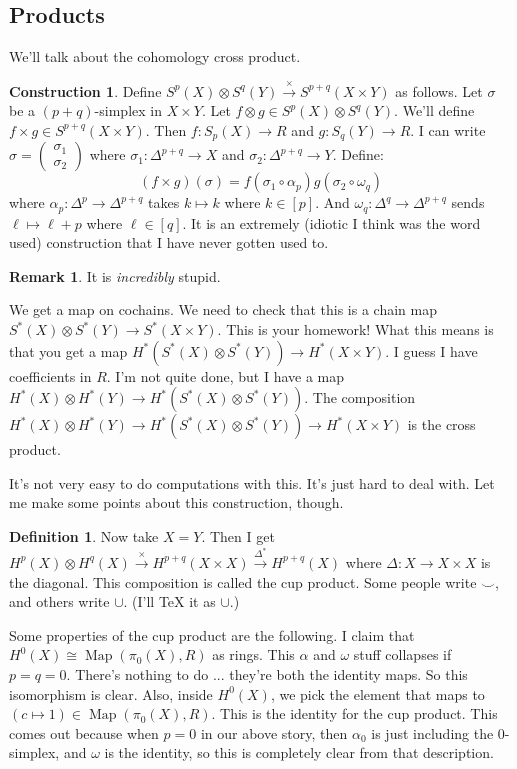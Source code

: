 \documentclass{amsart}
\theoremstyle{theorem}
\theoremstyle{definition}
\newtheorem{definition}[theorem]{Definition}
\newtheorem{construction}[theorem]{Construction}
\newtheorem{remark}[theorem]{Remark}
\DeclareMathOperator{\Map}{Map}
\begin{document}
\subsection{Products}
We'll talk about the cohomology cross product.
\begin{construction}
Define $S^p(X)\otimes S^q(Y)\xrightarrow{\times}S^{p+q}(X\times Y)$ as follows. Let $\sigma$ be a $(p+q)$-simplex in $X\times Y$. Let $f\otimes g\in S^p(X)\otimes S^q(Y)$. We'll define $f\times g\in S^{p+q}(X\times Y)$. Then $f:S_p(X)\to R$ and $g:S_q(Y)\to R$. I can write $\sigma=\begin{pmatrix}\sigma_1 \\ \sigma_2\end{pmatrix}$ where $\sigma_1:\Delta^{p+q}\to X$ and $\sigma_2:\Delta^{p+q}\to Y$. Define:
\begin{equation*}
(f\times g)(\sigma)=f(\sigma_1\circ\alpha_p)g(\sigma_2\circ\omega_q)
\end{equation*}
where $\alpha_p:\Delta^p\to\Delta^{p+q}$ takes $k\mapsto k$ where $k\in[p]$. And $\omega_q:\Delta^q\to\Delta^{p+q}$ sends $\ell\mapsto \ell+p$ where $\ell\in[q]$. It is an extremely (idiotic I think was the word used) construction that I have never gotten used to.
\begin{remark}
It is \emph{incredibly} stupid.
\end{remark}
We get a map on cochains. We need to check that this is a chain map $S^\ast(X)\otimes S^\ast(Y)\to S^\ast(X\times Y)$. This is your homework! What this means is that you get a map $ H^\ast(S^\ast(X)\otimes S^\ast(Y))\to H^\ast(X\times Y)$. I guess I have coefficients in $R$. I'm not quite done, but I have a map $ H^\ast(X)\otimes H^\ast(Y)\to H^\ast(S^\ast(X)\otimes S^\ast(Y))$. The composition $ H^\ast(X)\otimes H^\ast(Y)\to H^\ast(S^\ast(X)\otimes S^\ast(Y))\to H^\ast(X\times Y)$ is the cross product.
\end{construction}
It's not very easy to do computations with this. It's just hard to deal with. Let me make some points about this construction, though.
\begin{definition}
Now take $X=Y$. Then I get $ H^p(X)\otimes H^q(X)\xrightarrow{\times} H^{p+q}(X\times X)\xrightarrow{\Delta^\ast} H^{p+q}(X)$ where $\Delta:X\to X\times X$ is the diagonal. This composition is called the cup product. Some people write $\smile$, and others write $\cup$. (I'll TeX it as $\cup$.)
\end{definition}
Some properties of the cup product are the following. I claim that $ H^0(X)\cong\Map(\pi_0(X),R)$ as rings. This $\alpha$ and $\omega$ stuff collapses if $p=q=0$. There's nothing to do ... they're both the identity maps. So this isomorphism is clear. Also, inside $ H^0(X)$, we pick the element that maps to $(c\mapsto 1)\in\Map(\pi_0(X),R)$. This is the identity for the cup product. This comes out because when $p=0$ in our above story, then $\alpha_0$ is just including the $0$-simplex, and $\omega$ is the identity, so this is completely clear from that description.
\end{document}
